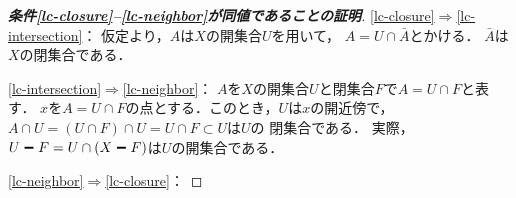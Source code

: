 \begin{proof}[\textbf{条件\eqref{lc-closure}--\eqref{lc-neighbor}が同値であることの証明}]
    
    \eqref{lc-closure}\(\Rightarrow\)\eqref{lc-intersection}：
    仮定より，\(A\)は\(X\)の開集合\(U\)を用いて，
    \(A=U\cap \bar{A}\)とかける．
    \(\bar{A}\)は\(X\)の閉集合である．

    \eqref{lc-intersection}\(\Rightarrow\)\eqref{lc-neighbor}：
    \(A\)を\(X\)の開集合\(U\)と閉集合\(F\)で\(A=U\cap F\)と表す．
    \(x\)を\(A=U\cap F\)の点とする．このとき，\(U\)は\(x\)の開近傍で，
    \(A\cap U=(U\cap F)\cap U= U\cap F\subset U\)は\(U\)の
    閉集合である．
    実際，\(U\sm F=U\cap (X\sm F)\)は\(U\)の開集合である．

    \eqref{lc-neighbor}\(\Rightarrow\)\eqref{lc-closure}：

\end{proof}

